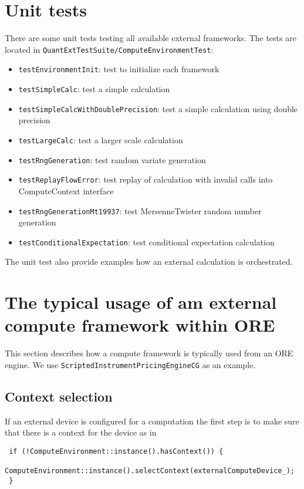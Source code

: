 \documentclass[12pt, a4paper]{article}
\begin{document}
\section{Unit tests}\label{unitTests}

There are some unit tests testing all available external frameworks. The tests are located in
\verb+QuantExtTestSuite/ComputeEnvironmentTest+:

\begin{itemize}
  \item \verb+testEnvironmentInit+: test to initialize each framework
  \item \verb+testSimpleCalc+: test a simple calculation
  \item \verb+testSimpleCalcWithDoublePrecision+: test a simple calculation using double precision
  \item \verb+testLargeCalc+: test a larger scale calculation
  \item \verb+testRngGeneration+: test random variate generation
  \item \verb+testReplayFlowError+: test replay of calculation with invalid calls into ComputeContext interface
  \item \verb+testRngGenerationMt19937+: test MersenneTwister random number generation
  \item \verb+testConditionalExpectation+: test conditional expectation calculation
\end{itemize}

The unit test also provide examples how an external calculation is orchestrated.

\section{The typical usage of am external compute framework within ORE}\label{usageFromORE}

This section describes how a compute framework is typically used from an ORE engine. We use
\verb+ScriptedInstrumentPricingEngineCG+ as an example.


\subsection{Context selection}

If an external device is configured for a computation the first step is to make sure that there is a context for the
device as in

\begin{verbatim}
 if (!ComputeEnvironment::instance().hasContext()) {
     ComputeEnvironment::instance().selectContext(externalComputeDevice_);
 }
\end{verbatim}
\end{document}
